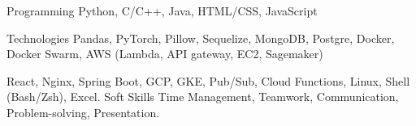 

\begin{cvskills}

  \cvskill
    {Programming} %
    {Python, C/C++, Java, HTML/CSS, JavaScript} %

  \cvskill
    {Technologies} %
    {Pandas, PyTorch, Pillow, Sequelize, MongoDB, Postgre, Docker, Docker Swarm, AWS (Lambda, API gateway, EC2, Sagemaker)}

  \cvskill 
  {}
  {React, Nginx, Spring Boot, GCP, GKE, Pub/Sub, Cloud Functions, Linux, Shell (Bash/Zsh),  Excel.}
  \cvskill
    {Soft Skills} %
    {Time Management, Teamwork, Communication, Problem-solving, Presentation.} %




\end{cvskills}



